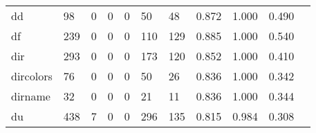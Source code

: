 \begin{longtable}{lp{1.2cm}p{1.2cm}p{1.2cm}p{1.2cm}p{1.2cm}p{1.2cm}p{1.2cm}p{1.2cm}p{1.2cm}p{1.2cm}}
dd        &                                    98 &                                                  0 &                                                  0 &                                                  0 &                                                 50 &                                                 48 &                                         0.872 &                                              1.000 &                                              0.490 \\
df        &                                   239 &                                                  0 &                                                  0 &                                                  0 &                                                110 &                                                129 &                                         0.885 &                                              1.000 &                                              0.540 \\
dir       &                                   293 &                                                  0 &                                                  0 &                                                  0 &                                                173 &                                                120 &                                         0.852 &                                              1.000 &                                              0.410 \\
dircolors &                                    76 &                                                  0 &                                                  0 &                                                  0 &                                                 50 &                                                 26 &                                         0.836 &                                              1.000 &                                              0.342 \\
dirname   &                                    32 &                                                  0 &                                                  0 &                                                  0 &                                                 21 &                                                 11 &                                         0.836 &                                              1.000 &                                              0.344 \\
du        &                                   438 &                                                  7 &                                                  0 &                                                  0 &                                                296 &                                                135 &                                         0.815 &                                              0.984 &                                              0.308 \\

\end{longtable}
